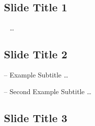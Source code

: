 \subsection{Slide Title 1}
\begin{frame}{~}
	\ldots
\end{frame}

\subsection{Slide Title 2}
\begin{frame}{-- Example Subtitle}
	\ldots
\end{frame}

\begin{frame}{-- Second Example Subtitle}
	\ldots
\end{frame}

\subsection{Slide Title 3}

